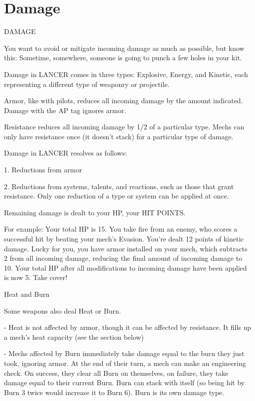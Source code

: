 \section{Damage}
 DAMAGE  

You want to avoid or mitigate incoming damage as much as possible, but know this: Sometime,  
somewhere, someone is going to punch a few holes in your kit. 
 

Damage in LANCER comes in three types: Explosive, Energy, and Kinetic, each representing a  
different type of weaponry or projectile.
 

Armor, like with pilots, reduces all incoming damage by the amount indicated. Damage with the  
AP tag ignores armor. 
 
Resistance reduces all incoming damage by 1/2 of a particular type. Mechs can only have  
resistance once (it doesn’t stack) for a particular type of damage. 
 

Damage in LANCER resolves as follows:
 
             1.  Reductions from armor
 
             2.  Reductions from systems, talents, and reactions, such as those that grant  
                 resistance. Only one reduction of a type or system can be applied at once.
 
Remaining damage is dealt to your HP, your HIT POINTS. 
 

For example: Your total HP is  15. You take fire from an enemy, who scores a successful hit by  
beating your mech’s Evasion. You’re dealt 12 points of kinetic damage. Lucky for you, you have  
armor installed on your mech, which subtracts 2 from all incoming damage, reducing the final  
amount of incoming damage to  10. Your total HP after all modifications to incoming damage  
have been applied is now 5. Take cover!   

                                               Heat and Burn  

Some weapons also deal Heat or Burn. 
 
    -    Heat is not affected by armor, though it can be affected by resistance. It fills up a mech’s  
         heat capacity (see the section below)
 
    -    Mechs affected by Burn immediately take damage equal to the burn they just took,  
         ignoring armor. At the end of their turn, a mech can make an engineering check. On  
        success, they clear all Burn on themselves, on failure, they take damage equal to their  
        current Burn. Burn can stack with itself (so being hit by Burn 3 twice would increase it to  
         Burn 6). Burn is its own damage type.
 
